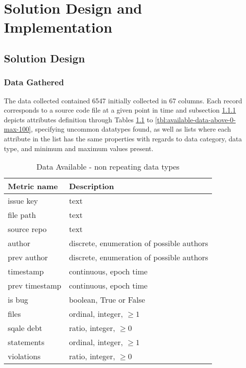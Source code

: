 \newcommand{\figpath}{Figures}
\newcommand{\totalRows}{6547}
\newcommand{\totalJavaRows}{4239}
\newcommand{\totalJavaScriptRows}{2308}
\newcommand{\totalDiscardedRows}{2985}
\newcommand{\javaDiscardedRows}{2126}
\newcommand{\jsDiscardedRows}{859}
\newcommand{\totalDeletedFiles}{432}
\newcommand{\remainingJavaFileCount}{2113}
\newcommand{\remainingJsFileCount}{1449}
\newenvironment{code}{\captionsetup{type=listing}}{}

\chapter{Solution Design and Implementation}\label{sec:design-and-impl-parent}
\section{Solution Design}\label{sec:design}
\subsection{Data Gathered}\label{sec:data-available}
The data collected contained \totalRows{} initially collected in 67 columns. Each record corresponds to a source code file at a given point in time and subsection \ref{sec:data-available} depicts attributes definition through Tables \ref{tbl:available-data-non-repeating-types} to \ref{tbl:available-data-above-0-max-100}, specifying uncommon datatypes found, as well as lists where each attribute in the list has the same properties with regards to data category, data type, and minimum and maximum values present. 

\begin{table}[h!]
\caption{Data Available - non repeating data types}
\label{tbl:available-data-non-repeating-types}
\begin{tabular}{@{}ll@{}}
\toprule
Metric name & Description \\ \midrule
issue key & text \\ 
file path & text \\
source repo & text \\
author & discrete, enumeration of possible authors \\
prev author & discrete, enumeration of possible authors\\
timestamp & continuous, epoch time \\
prev timestamp & continuous, epoch time \\
is bug & boolean, True or False \\
files & ordinal, integer, $\geq{}1$ \\
sqale debt & ratio, integer, $\geq{}0$ \\
statements & ordinal, integer, $\geq{}1$ \\
violations & ratio, integer, $\geq{}0$ \\ \bottomrule
\end{tabular}
\end{table}

